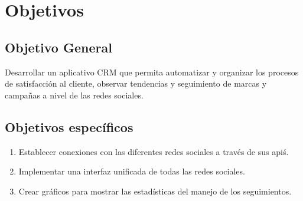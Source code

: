 \chapter{Objetivos}
\section{Objetivo General}
Desarrollar un aplicativo CRM que permita automatizar y organizar los procesos de satisfacci\'on al cliente, observar tendencias y seguimiento de marcas y campa\~nas a nivel de las redes sociales.%
\section{Objetivos espec\'ificos}
\begin{enumerate}
\item Establecer conexiones con las diferentes redes sociales a trav\'es de sus api\'s.
\item Implementar una interfaz unificada de todas las redes sociales.%
\item Crear gr\'aficos para mostrar las estad\'isticas del manejo de los seguimientos.
\end{enumerate}